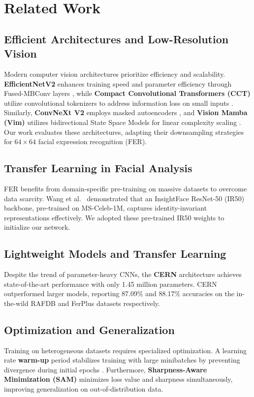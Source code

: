 \section{Related Work}
\label{sec:related}

\subsection{Efficient Architectures and Low-Resolution Vision}
Modern computer vision architectures prioritize efficiency and scalability. 
\textbf{EfficientNetV2} enhances training speed and parameter efficiency through Fused-MBConv layers \cite{tan2021efficientnetv2smallermodelsfaster}, while \textbf{Compact Convolutional Transformers (CCT)} utilize convolutional tokenizers to address information loss on small inputs \cite{hassani2022escapingbigdataparadigm}. 
Similarly, \textbf{ConvNeXt V2} employs masked autoencoders \cite{woo2023convnextv2codesigningscaling}, and \textbf{Vision Mamba (Vim)} utilizes bidirectional State Space Models for linear complexity scaling \cite{zhu2024visionmambaefficientvisual}. 
Our work evaluates these architectures, adapting their downsampling strategies for $64 \times 64$ facial expression recognition (FER).

\subsection{Transfer Learning in Facial Analysis}

FER benefits from domain-specific pre-training on massive datasets to overcome data scarcity. 
Wang et al.\ \cite{wang2025qcsfeaturerefiningquadruplet} demonstrated that an InsightFace ResNet-50 (IR50) backbone, pre-trained on MS-Celeb-1M, captures identity-invariant representations effectively. 
We adopted these pre-trained IR50 weights to initialize our network.

\subsection{Lightweight Models and Transfer Learning}
Despite the trend of parameter-heavy CNNs, the \textbf{CERN} \cite{GERA20229} architecture achieves state-of-the-art performance with only 1.45 million parameters. 
CERN outperformed larger models, reporting 87.09\% and 88.17\% accuracies on the in-the-wild RAFDB and FerPlus datasets respectively.


\subsection{Optimization and Generalization}
Training on heterogeneous datasets requires specialized optimization. 
A learning rate \textbf{warm-up} period stabilizes training with large minibatches by preventing divergence during initial epochs \cite{goyal2018accuratelargeminibatchsgd}. 
Furthermore, \textbf{Sharpness-Aware Minimization (SAM)} \cite{foret2021sharpnessawareminimizationefficientlyimproving} minimizes loss value and sharpness simultaneously, improving generalization on out-of-distribution data.

